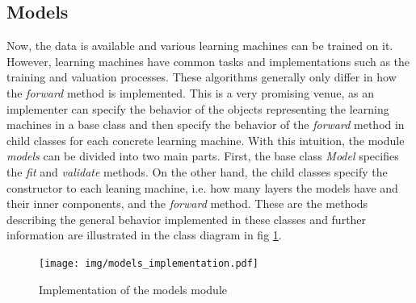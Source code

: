 		\subsection{Models}\label{subsec:models}
			Now, the data is available and various learning machines can be trained on it. However, learning machines have common tasks and implementations such as the training and valuation processes. These algorithms generally only differ in how the \textit{forward} method is implemented. This is a very promising venue, as an implementer can specify the behavior of the objects representing the learning machines in a base class and then specify the behavior of the \textit{forward} method in child classes for each concrete learning machine. With this intuition, the module \textit{models} can be divided into two main parts. First, the base class \textit{Model} specifies the \textit{fit} and \textit{validate} methods. On the other hand, the child classes specify the constructor to each leaning machine, i.e. how many layers the models have and their inner components, and the \textit{forward} method. These are the methods describing the general behavior implemented in these classes and further information are illustrated in the class diagram in fig \ref{fig:models_implementation}.
			\begin{figure}[H]
				\centering
				\texttt{[image: img/models\_implementation.pdf]}
				\caption{Implementation of the models module}
				\label{fig:models_implementation}
			\end{figure}
